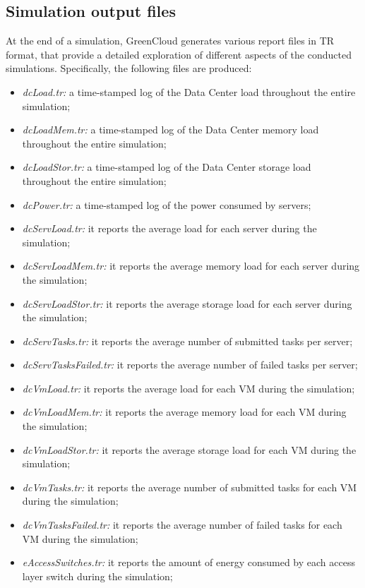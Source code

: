 \subsection{Simulation output files} \label{subsection:simulationoutput}
At the end of a simulation, GreenCloud generates various report files in TR format, that provide a detailed exploration of different aspects of the conducted simulations. Specifically, the following files are produced:
\begin{itemize}
    \item \emph{dcLoad.tr:} a time-stamped log of the Data Center load throughout the entire simulation;
    \item \emph{dcLoadMem.tr:} a time-stamped log of the Data Center memory load throughout the entire simulation;
    \item \emph{dcLoadStor.tr:} a time-stamped log of the Data Center storage load throughout the entire simulation;
    \item \emph{dcPower.tr:} a time-stamped log of the power consumed by servers;
    \item \emph{dcServLoad.tr:} it reports the average load for each server during the simulation;
    \item \emph{dcServLoadMem.tr:} it reports the average memory load for each server during the simulation;
    \item \emph{dcServLoadStor.tr:} it reports the average storage load for each server during the simulation;
    \item \emph{dcServTasks.tr:} it reports the average number of submitted tasks per server;
    \item \emph{dcServTasksFailed.tr:} it reports the average number of failed tasks per server;
    \item \emph{dcVmLoad.tr:} it reports the average load for each VM during the simulation;
    \item \emph{dcVmLoadMem.tr:} it reports the average memory load for each VM during the simulation;
    \item \emph{dcVmLoadStor.tr:} it reports the average storage load for each VM during the simulation;
    \item \emph{dcVmTasks.tr:} it reports the average number of submitted tasks for each VM during the simulation;
    \item \emph{dcVmTasksFailed.tr:} it reports the average number of failed tasks for each VM during the simulation;
    \item \emph{eAccessSwitches.tr:} it reports the amount of energy consumed by each access layer switch during the simulation;

\end{itemize}
